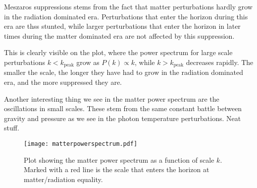 \documentclass[12pt]{article}
\begin{document}
Meszaros suppressions stems from the fact that matter perturbations hardly grow in the radiation dominated era. Perturbations that enter the horizon during this era are thss stunted, while larger perturbations that enter the horizon in later times during the matter dominated era are not affected by this suppression. 

This is clearly visible on the plot, where the power spectrum for large scale perturbations $k < k_{\mathrm{peak}}$ grow as $P(k) \propto k$, while $k > k_{\mathrm{peak}}$ decreases rapidly. The smaller the scale, the longer they have had to grow in the radiation dominated era, and the more suppressed they are.

Another interesting thing we see in the matter power spectrum are the oscillations in small scales. These stem from the same constant battle between gravity and pressure as we see in the photon temperature perturbations. Neat stuff.

\begin{figure}[h]
    \centering
    \texttt{[image: matterpowerspectrum.pdf]} 
    \caption{Plot showing the matter power spectrum as a function of scale $k$. Marked with a red line is the scale that enters the horizon at matter/radiation equality.}
    \label{fig:matter power spectrum}
\end{figure}

{}

\end{document}
